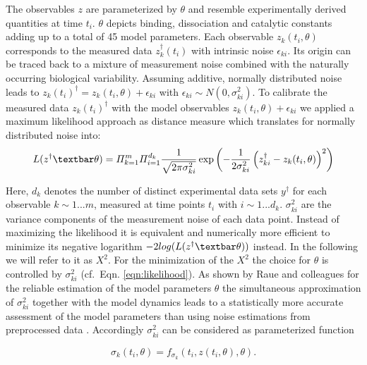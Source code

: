 The observables $z$ are parameterized by $\theta$ and resemble experimentally derived quantities at time $t_i$. $\theta$ depicts binding, dissociation and catalytic constants adding up to a total of 45 model parameters. Each observable $z_k(t_i,\theta)$ corresponds to the measured data $z_k^\dag(t_i)$ with intrinsic noise $\epsilon_{ki}$. Its origin can be traced back to a mixture of measurement noise combined with the naturally occurring biological variability. Assuming additive, normally distributed noise leads to $z_k(t_i)^\dag = z_k(t_i,\theta) + \epsilon_{ki}$ with $\epsilon_{ki} \sim N(0,\sigma_{ki}^2)$. To calibrate the measured data $z_k(t_i)^\dag$ with the model observables $z_k(t_i,\theta)+\epsilon_{ki}$ we applied a maximum likelihood approach as distance measure which translates for normally distributed noise into:
\begin{equation}
\label{eqn:likelihood}
L(z^\dag \textbar \theta) = \varPi_{k=1}^m \varPi_{i=1}^{d_k} \frac{1}{\sqrt{2\pi \sigma_{ki}^2}}\exp \left( -\frac{1}{2\sigma_{ki}^2}\left(z_{ki}^\dag - z_k(t_i,\theta)\right)^2\right)
\end{equation}
  
Here, $d_k$ denotes the number of distinct experimental data sets $y^\dag$ for each observable $k\sim 1 ...m$, measured at time points $t_i$ with $i\sim 1 ... d_k$. $\sigma_{ki}^2$ are the variance components of the measurement noise of each data point. Instead of maximizing the likelihood it is equivalent and numerically more efficient to minimize its negative logarithm $-2log(L(z^\dag\textbar\theta))$ instead. In the following we will refer to it as $X^2$.  For the minimization of the $X^2$ the choice for $\theta$ is controlled by $\sigma_{ki}^2$ (cf.\ Eqn. \ref{eqn:likelihood}). As shown by Raue and colleagues for the reliable estimation of the model parameters $\theta$ the simultaneous approximation of $\sigma_{ki}^2$ together with the model dynamics leads to a statistically more accurate assessment of the model parameters than using noise estimations from preprocessed data \cite{Raue2013}. Accordingly $\sigma_{ki}^2$ can be considered as parameterized function

\begin{equation}
\sigma_{k}(t_i,\theta) = f_{\sigma_{k}}(t_i,z(t_i,\theta),\theta).
\end{equation}    

